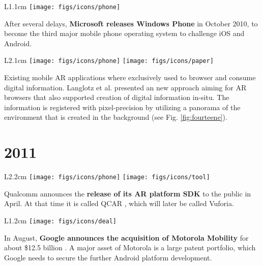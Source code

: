 \documentclass[12pt,a4paper]{article}
\begin{document}
\vspace{0.1in}

\begin{wrapfigure}{L}{1.1cm}
	\vspace{-15pt}	
	\texttt{[image: figs/icons/phone]}
	\vspace{-20pt}		
\end{wrapfigure}
\noindent After several delays, \textbf{Microsoft releases Windows Phone} in October 2010, to become the third major mobile phone operating system to challenge iOS and Android. 
\newpage

\begin{wrapfigure}{L}{2.1cm}
	\vspace{-0pt}	
	\texttt{[image: figs/icons/phone]}
	\texttt{[image: figs/icons/paper]}
	\vspace{-25pt}		
\end{wrapfigure} 
\noindent Existing mobile AR applications where exclusively used to browser and consume digital information. Langlotz et al. presented an new approach aiming for AR browsers that also supported creation of digital information in-situ. The information is registered with pixel-precision by utilizing a panorama of the environment that is created in the background \cite{Langlotz12} (see Fig. \ref{fig:fourteene}).

\vspace{-5pt}
\section*{2011}

\begin{wrapfigure}{L}{2.2cm}
	\vspace{-15pt}	
	\texttt{[image: figs/icons/phone]}
	\texttt{[image: figs/icons/tool]}
	\vspace{-20pt}		
\end{wrapfigure} 
Qualcomm announces the \textbf{release of its AR platform SDK} to the public in April. At that time it is called QCAR , which will later be called Vuforia.

\vspace{0.1in}

\begin{wrapfigure}{L}{1.2cm}
	\vspace{-10pt}	
	\texttt{[image: figs/icons/deal]}
	\vspace{-10pt}		
\end{wrapfigure} 
\noindent In August, \textbf{Google announces the acquisition of Motorola Mobility} for about \$12.5 billion . A major asset of Motorola is a large patent portfolio, which Google needs to secure the further Android platform development. 
\end{document}
